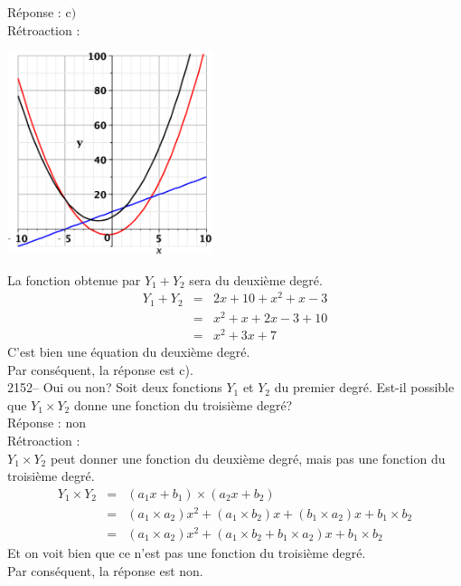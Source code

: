 \documentclass[letterpaper, 12pt]{article}
\begin{document}
R\'eponse : c$)$\\

R\'etroaction :
\begin{center}
 \includegraphics[width=6cm,bb=20 118 575 673]{Q2151.eps}
\end{center}
La fonction obtenue par $Y_{1}+Y_{2}$ sera du deuxi\`eme degr\'e.
\begin{eqnarray*}
Y_{1}+Y_{2} &=& 2x+10+x^{2}+x-3\\
&=&x^{2}+x+2x-3+10\\
&=&x^{2}+3x+7
\end{eqnarray*}
C'est bien une \'equation du deuxi\`eme degr\'e.\\
Par cons\'equent, la r\'eponse est c).\\


2152-- Oui ou non? Soit deux fonctions $Y_{1}$ et $Y_{2}$ du premier degr\'e. Est-il possible que $Y_{1} \times Y_{2}$ donne une fonction du troisi\`eme degr\'e?\\

R\'eponse : non\\

R\'etroaction :\\
$Y_{1} \times Y_{2}$ peut donner une fonction du deuxi\`eme degr\'e, mais pas une fonction du troisi\`eme degr\'e.
\begin{eqnarray*}
 Y_{1} \times Y_{2} &=& (a_{1}x+b_{1})\times(a_{2}x+b_{2})\\
&=& (a_{1}\times a_{2})x^{2}+(a_{1}\times b_{2})x+(b_{1}\times a_{2})x + b_{1}\times b_{2}\\
&=& (a_{1}\times a_{2})x^{2}+(a_{1}\times b_{2}+b_{1}\times a_{2})x + b_{1}\times b_{2}
\end{eqnarray*}
Et on voit bien que ce n'est pas une fonction du troisi\`eme degr\'e.\\
Par cons\'equent, la r\'eponse est non.\\
\end{document}
